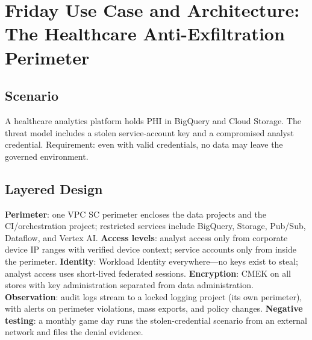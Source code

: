 \section{Friday Use Case and Architecture: The Healthcare Anti-Exfiltration Perimeter}

\subsection{Scenario}
A healthcare analytics platform holds PHI in BigQuery and Cloud Storage. The threat model includes a stolen service-account key and a compromised analyst credential. Requirement: even with valid credentials, no data may leave the governed environment.

\subsection{Layered Design}
\textbf{Perimeter}: one VPC SC perimeter encloses the data projects and the CI/orchestration project; restricted services include BigQuery, Storage, Pub/Sub, Dataflow, and Vertex AI. \textbf{Access levels}: analyst access only from corporate device IP ranges with verified device context; service accounts only from inside the perimeter. \textbf{Identity}: Workload Identity everywhere---no keys exist to steal; analyst access uses short-lived federated sessions. \textbf{Encryption}: CMEK on all stores with key administration separated from data administration. \textbf{Observation}: audit logs stream to a locked logging project (its own perimeter), with alerts on perimeter violations, mass exports, and policy changes. \textbf{Negative testing}: a monthly game day runs the stolen-credential scenario from an external network and files the denial evidence.

